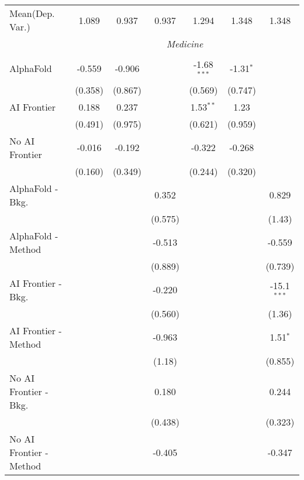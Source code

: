\begin{tabular}{lcccccc}
Mean(Dep. Var.) & 1.089 & 0.937 & 0.937 & 1.294 & 1.348 & 1.348 \\
 & \multicolumn{6}{c}{\textit{Medicine}} \\ \\
   AlphaFold               & -0.559  & -0.906  &         & -1.68$^{***}$ & -1.31$^{*}$ &   \\   
                           & (0.358) & (0.867) &         & (0.569)       & (0.747)     &   \\   
   AI Frontier             & 0.188   & 0.237   &         & 1.53$^{**}$   & 1.23        &   \\   
                           & (0.491) & (0.975) &         & (0.621)       & (0.959)     &   \\   
   No AI Frontier          & -0.016  & -0.192  &         & -0.322        & -0.268      &   \\   
                           & (0.160) & (0.349) &         & (0.244)       & (0.320)     &   \\   
   AlphaFold - Bkg.        &         &         & 0.352   &               &             & 0.829\\   
                           &         &         & (0.575) &               &             & (1.43)\\   
   AlphaFold - Method      &         &         & -0.513  &               &             & -0.559\\   
                           &         &         & (0.889) &               &             & (0.739)\\   
   AI Frontier - Bkg.      &         &         & -0.220  &               &             & -15.1$^{***}$\\   
                           &         &         & (0.560) &               &             & (1.36)\\   
   AI Frontier - Method    &         &         & -0.963  &               &             & 1.51$^{*}$\\   
                           &         &         & (1.18)  &               &             & (0.855)\\   
   No AI Frontier - Bkg.   &         &         & 0.180   &               &             & 0.244\\   
                           &         &         & (0.438) &               &             & (0.323)\\   
   No AI Frontier - Method &         &         & -0.405  &               &             & -0.347\\   

\end{tabular}

